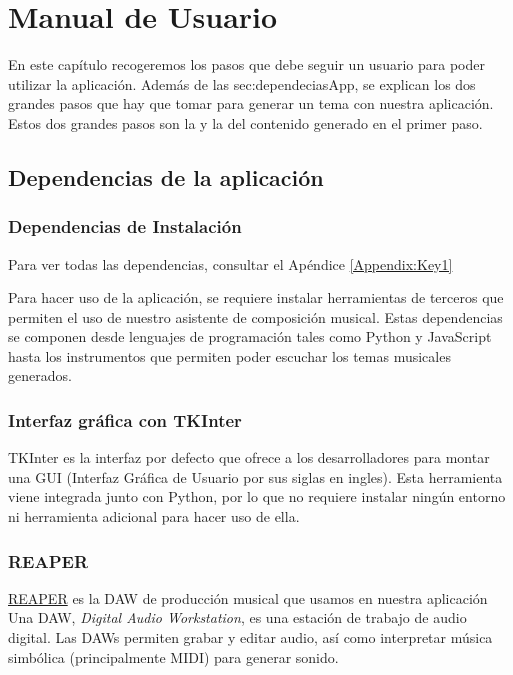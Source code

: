 \chapter{Manual de Usuario}
\label{cap:descripcionTrabajo}

En este capítulo recogeremos los pasos que debe seguir un usuario para poder utilizar la aplicación. Además de las \refname{sec:dependeciasApp}, se explican los dos grandes pasos que hay que tomar para generar un tema con nuestra aplicación. 
Estos dos grandes pasos son la  y la  del contenido generado en el primer paso. 

\section{Dependencias de la aplicación}
\label{sec:dependeciasApp}
\subsection{Dependencias de Instalación}
	Para ver todas las dependencias, consultar el Apéndice \ref{Appendix:Key1}

	Para hacer uso de la aplicación, se requiere instalar herramientas de terceros que permiten el uso de nuestro asistente de composición musical.
	Estas dependencias se componen desde lenguajes de programación tales como Python y JavaScript hasta los instrumentos que permiten poder escuchar los temas musicales generados.

\subsection{Interfaz gráfica con TKInter}
	TKInter es la interfaz por defecto que \PythonLink{} ofrece a los desarrolladores para montar una 
    GUI (Interfaz Gráfica de Usuario por sus siglas en ingles).
	Esta herramienta viene integrada junto con Python, por lo que no requiere instalar ningún entorno ni herramienta adicional para hacer uso de ella.

\subsection{REAPER}
\label{subsec:reaper}
	\href{https://www.reaper.fm/}{REAPER} es la DAW de producción musical que usamos en nuestra aplicación
	Una DAW, \textit{Digital Audio Workstation}, es una estación de trabajo de audio digital. Las DAWs permiten grabar y editar audio, así como interpretar música simbólica (principalmente MIDI) para generar sonido.

